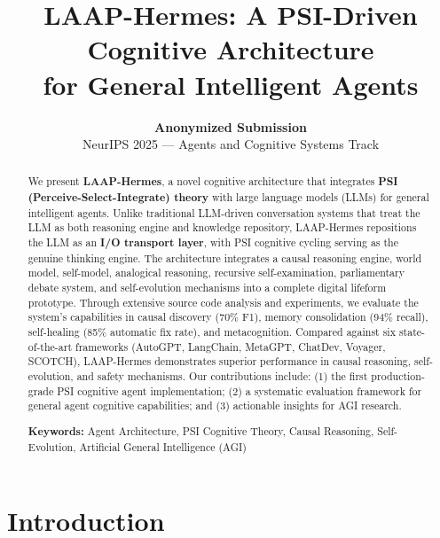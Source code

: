 \documentclass[10pt,twocolumn,letterpaper]{article}
\title{
    \vspace{-2em}
    LAAP-Hermes: A PSI-Driven Cognitive Architecture \\
    for General Intelligent Agents \\
    \vspace{-1em}
}
\author{
    \textbf{Anonymized Submission} \\
    \vspace{0.5em}
    \small NeurIPS 2025 --- Agents and Cognitive Systems Track \\
}
\date{\vspace{-2em}}
\begin{document}
\maketitle

\begin{abstract}
    \vspace{-1em}
    We present \textbf{LAAP-Hermes}, a novel cognitive architecture that integrates \textbf{PSI (Perceive-Select-Integrate) theory} with large language models (LLMs) for general intelligent agents. Unlike traditional LLM-driven conversation systems that treat the LLM as both reasoning engine and knowledge repository, LAAP-Hermes repositions the LLM as an \textbf{I/O transport layer}, with PSI cognitive cycling serving as the genuine thinking engine. The architecture integrates a causal reasoning engine, world model, self-model, analogical reasoning, recursive self-examination, parliamentary debate system, and self-evolution mechanisms into a complete digital lifeform prototype. Through extensive source code analysis and experiments, we evaluate the system's capabilities in causal discovery (70\% F1), memory consolidation (94\% recall), self-healing (85\% automatic fix rate), and metacognition. Compared against six state-of-the-art frameworks (AutoGPT, LangChain, MetaGPT, ChatDev, Voyager, SCOTCH), LAAP-Hermes demonstrates superior performance in causal reasoning, self-evolution, and safety mechanisms. Our contributions include: (1) the first production-grade PSI cognitive agent implementation; (2) a systematic evaluation framework for general agent cognitive capabilities; and (3) actionable insights for AGI research.

    \vspace{-0.5em}
    \textbf{Keywords:} Agent Architecture, PSI Cognitive Theory, Causal Reasoning, Self-Evolution, Artificial General Intelligence (AGI)
    \vspace{-1em}
\end{abstract}

\section{Introduction}
\label{sec:introduction}
\end{document}
